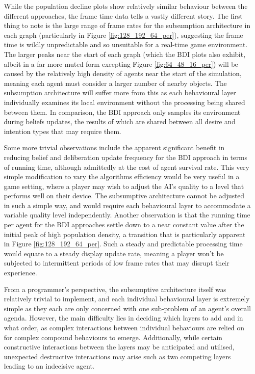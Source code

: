 \documentclass[a4paper,12pt]{article}
\begin{document}
While the population decline plots show relatively similar behaviour between the different approaches, the frame time data tells a vastly different story. The first thing to note is the large range of frame rates for the subsumption architecture in each graph (particularly in Figure \ref{fig:128_192_64_per}), suggesting the frame time is wildly unpredictable and so unsuitable for a real-time game environment. The larger peaks near the start of each graph (which the BDI plots also exhibit, albeit in a far more muted form excepting Figure \ref{fig:64_48_16_per}) will be caused by the relatively high density of agents near the start of the simulation, meaning each agent must consider a larger number of nearby objects. The subsumption architecture will suffer more from this as each behavioural layer individually examines its local environment without the processing being shared between them. In comparison, the BDI approach only samples its environment during beliefs updates, the results of which are shared between all desire and intention types that may require them.

Some more trivial observations include the apparent significant benefit in reducing belief and deliberation update frequency for the BDI approach in terms of running time, although admittedly at the cost of agent survival rate. This very simple modification to vary the algorithms efficiency would be very useful in a game setting, where a player may wish to adjust the AI's quality to a level that performs well on their device. The subsumptive architecture cannot be adjusted in such a simple way, and would require each behavioural layer to accommodate a variable quality level independently. Another observation is that the running time per agent for the BDI approaches settle down to a near constant value after the initial peak of high population density, a transition that is particularly apparent in Figure \ref{fig:128_192_64_per}. Such a steady and predictable processing time would equate to a steady display update rate, meaning a player won't be subjected to intermittent periods of low frame rates that may disrupt their experience.

From a programmer's perspective, the subsumptive architecture itself was relatively trivial to implement, and each individual behavioural layer is extremely simple as they each are only concerned with one sub-problem of an agent's overall agenda. However, the main difficulty lies in deciding which layers to add and in what order, as complex interactions between individual behaviours are relied on for complex compound behaviours to emerge. Additionally, while certain constructive interactions between the layers may be anticipated and utilised, unexpected destructive interactions may arise such as two competing layers leading to an indecisive agent.
\end{document}
